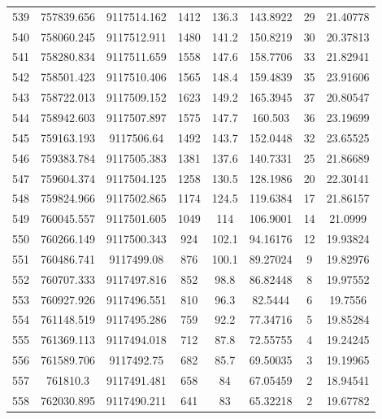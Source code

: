 \begin{longtable}{cccccccc}
539  & 757839.656      & 9117514.162      & 1412    & 136.3 & 143.8922 & 29 & 21.40778 \\
540  & 758060.245      & 9117512.911      & 1480    & 141.2 & 150.8219 & 30 & 20.37813 \\
541  & 758280.834      & 9117511.659      & 1558    & 147.6 & 158.7706 & 33 & 21.82941 \\
542  & 758501.423      & 9117510.406      & 1565    & 148.4 & 159.4839 & 35 & 23.91606 \\
543  & 758722.013      & 9117509.152      & 1623    & 149.2 & 165.3945 & 37 & 20.80547 \\
544  & 758942.603      & 9117507.897      & 1575    & 147.7 & 160.503  & 36 & 23.19699 \\
545  & 759163.193      & 9117506.64       & 1492    & 143.7 & 152.0448 & 32 & 23.65525 \\
546  & 759383.784      & 9117505.383      & 1381    & 137.6 & 140.7331 & 25 & 21.86689 \\
547  & 759604.374      & 9117504.125      & 1258    & 130.5 & 128.1986 & 20 & 22.30141 \\
548  & 759824.966      & 9117502.865      & 1174    & 124.5 & 119.6384 & 17 & 21.86157 \\
549  & 760045.557      & 9117501.605      & 1049    & 114   & 106.9001 & 14 & 21.0999  \\
550  & 760266.149      & 9117500.343      & 924     & 102.1 & 94.16176 & 12 & 19.93824 \\
551  & 760486.741      & 9117499.08       & 876     & 100.1 & 89.27024 & 9  & 19.82976 \\
552  & 760707.333      & 9117497.816      & 852     & 98.8  & 86.82448 & 8  & 19.97552 \\
553  & 760927.926      & 9117496.551      & 810     & 96.3  & 82.5444  & 6  & 19.7556  \\
554  & 761148.519      & 9117495.286      & 759     & 92.2  & 77.34716 & 5  & 19.85284 \\
555  & 761369.113      & 9117494.018      & 712     & 87.8  & 72.55755 & 4  & 19.24245 \\
556  & 761589.706      & 9117492.75       & 682     & 85.7  & 69.50035 & 3  & 19.19965 \\
557  & 761810.3        & 9117491.481      & 658     & 84    & 67.05459 & 2  & 18.94541 \\
558  & 762030.895      & 9117490.211      & 641     & 83    & 65.32218 & 2  & 19.67782 \\

\end{longtable}
